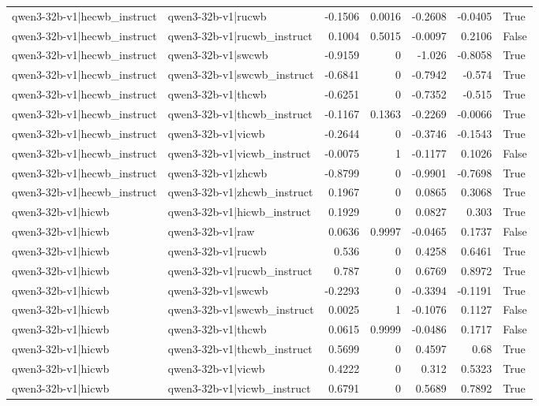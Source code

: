 \begin{table}
\begin{tabular}{l l r r r r l}
qwen3-32b-v1|hecwb_instruct & qwen3-32b-v1|rucwb & -0.1506 & 0.0016 & -0.2608 & -0.0405 & True \\
qwen3-32b-v1|hecwb_instruct & qwen3-32b-v1|rucwb_instruct & 0.1004 & 0.5015 & -0.0097 & 0.2106 & False \\
qwen3-32b-v1|hecwb_instruct & qwen3-32b-v1|swcwb & -0.9159 & 0 & -1.026 & -0.8058 & True \\
qwen3-32b-v1|hecwb_instruct & qwen3-32b-v1|swcwb_instruct & -0.6841 & 0 & -0.7942 & -0.574 & True \\
qwen3-32b-v1|hecwb_instruct & qwen3-32b-v1|thcwb & -0.6251 & 0 & -0.7352 & -0.515 & True \\
qwen3-32b-v1|hecwb_instruct & qwen3-32b-v1|thcwb_instruct & -0.1167 & 0.1363 & -0.2269 & -0.0066 & True \\
qwen3-32b-v1|hecwb_instruct & qwen3-32b-v1|vicwb & -0.2644 & 0 & -0.3746 & -0.1543 & True \\
qwen3-32b-v1|hecwb_instruct & qwen3-32b-v1|vicwb_instruct & -0.0075 & 1 & -0.1177 & 0.1026 & False \\
qwen3-32b-v1|hecwb_instruct & qwen3-32b-v1|zhcwb & -0.8799 & 0 & -0.9901 & -0.7698 & True \\
qwen3-32b-v1|hecwb_instruct & qwen3-32b-v1|zhcwb_instruct & 0.1967 & 0 & 0.0865 & 0.3068 & True \\
qwen3-32b-v1|hicwb & qwen3-32b-v1|hicwb_instruct & 0.1929 & 0 & 0.0827 & 0.303 & True \\
qwen3-32b-v1|hicwb & qwen3-32b-v1|raw & 0.0636 & 0.9997 & -0.0465 & 0.1737 & False \\
qwen3-32b-v1|hicwb & qwen3-32b-v1|rucwb & 0.536 & 0 & 0.4258 & 0.6461 & True \\
qwen3-32b-v1|hicwb & qwen3-32b-v1|rucwb_instruct & 0.787 & 0 & 0.6769 & 0.8972 & True \\
qwen3-32b-v1|hicwb & qwen3-32b-v1|swcwb & -0.2293 & 0 & -0.3394 & -0.1191 & True \\
qwen3-32b-v1|hicwb & qwen3-32b-v1|swcwb_instruct & 0.0025 & 1 & -0.1076 & 0.1127 & False \\
qwen3-32b-v1|hicwb & qwen3-32b-v1|thcwb & 0.0615 & 0.9999 & -0.0486 & 0.1717 & False \\
qwen3-32b-v1|hicwb & qwen3-32b-v1|thcwb_instruct & 0.5699 & 0 & 0.4597 & 0.68 & True \\
qwen3-32b-v1|hicwb & qwen3-32b-v1|vicwb & 0.4222 & 0 & 0.312 & 0.5323 & True \\
qwen3-32b-v1|hicwb & qwen3-32b-v1|vicwb_instruct & 0.6791 & 0 & 0.5689 & 0.7892 & True \\

\end{tabular}
\end{table}
